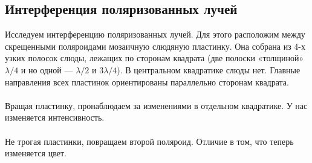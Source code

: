 \documentclass[11pt]{article}
\begin{document}
 \subsection{Интерференция поляризованных лучей}
Исследуем интерференцию поляризованных лучей. Для этого расположим между скрещенными поляроидами мозаичную слюдяную пластинку. Она собрана из 4-х узких полосок слюды, лежащих по сторонам квадрата (две полоски «толщиной» $ \lambda / 4 $ и но одной — $ \lambda / 2 $ и $ 3 \lambda / 4 $). В центральном квадратике слюды нет. Главные направления всех пластинок ориентированы параллельно сторонам квадрата.
\\\\

Вращая пластинку, пронаблюдаем за изменениями в отдельном квадратике. У нас изменяется интенсивность.
\\\\

Не трогая пластинки, повращаем второй поляроид. Отличие в том, что теперь изменяется цвет.
\end{document}
